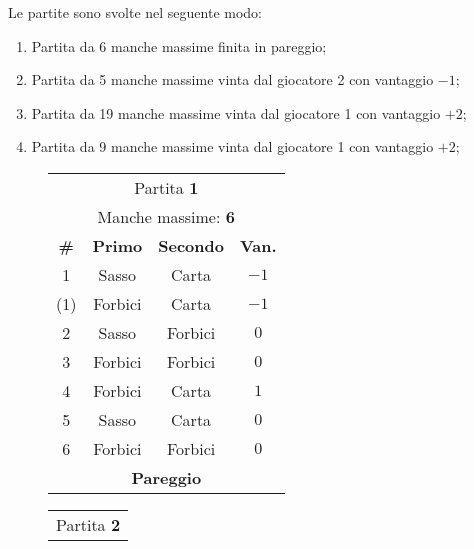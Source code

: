 \documentclass[a4paper]{article}
\begin{document}
\vspace{1em}
\noindent Le partite sono svolte nel seguente modo:
\begin{enumerate}
	\item Partita da 6 manche massime finita in pareggio;
	\item Partita da 5 manche massime vinta dal giocatore 2 con vantaggio \( -1 \);
	\item Partita da 19 manche massime vinta dal giocatore 1 con vantaggio \( +2 \);
	\item Partita da 9 manche massime vinta dal giocatore 1 con vantaggio \( +2 \);
\end{enumerate}
\begin{figure}[H]
  \centering

	\begin{minipage}{\linewidth}
  \centering
		\begin{minipage}{0.45\linewidth}
  \centering
        \begin{tabular}{|c|c|c|c|}
          \hline
          \multicolumn{4}{|c|}{Partita \textbf{1}} \\
          \multicolumn{4}{|c|}{\footnotesize Manche massime: \textbf{6}} \\
          \hline
          \footnotesize \textbf{\#} & \footnotesize \textbf{Primo} & \footnotesize \textbf{Secondo} & \footnotesize \textbf{Van.} \\
          \hline
          1 & Sasso & Carta & \( -1 \)  \\
          (1) & Forbici & Carta & \( -1 \)  \\
          2 & Sasso & Forbici & \( 0 \)  \\
          3 & Forbici & Forbici & \( 0 \)  \\
          4 & Forbici & Carta & \( 1 \)  \\
          5 & Sasso & Carta & \( 0 \)  \\
          6 & Forbici & Forbici & \( 0 \)  \\
          \hline
          \multicolumn{4}{|c|}{\footnotesize \textbf{Pareggio}} \\
          \hline
        \end{tabular}
		\end{minipage}
		\hspace{0.05\linewidth}
		\begin{minipage}{0.45\linewidth}
  \centering
        \begin{tabular}{|c|c|c|c|}
          \hline
          \multicolumn{4}{|c|}{Partita \textbf{2}} \\

\end{tabular}
\end{minipage}
\end{minipage}
\end{figure}
\end{document}
